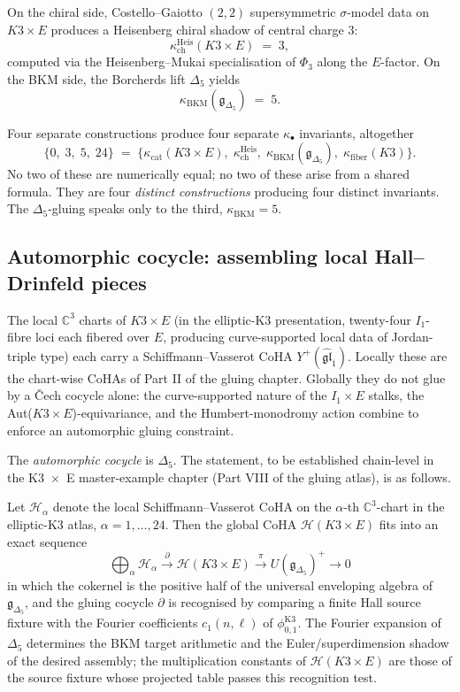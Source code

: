 On the chiral side, Costello--Gaiotto $(2, 2)$ supersymmetric $\sigma$-model data on $K3 \times E$ produces a Heisenberg chiral shadow of central charge $3$:
\[
  \kappa_{\mathrm{ch}}^{\mathrm{Heis}}(K3 \times E) \;=\; 3,
\]
computed via the Heisenberg--Mukai specialisation of $\Phi_3$ along the $E$-factor. On the BKM side, the Borcherds lift $\Delta_5$ yields
\[
  \kappa_{\mathrm{BKM}}(\mathfrak g_{\Delta_5}) \;=\; 5.
\]

Four separate constructions produce four separate $\kappa_\bullet$ invariants, altogether
\[
  \{0, \; 3, \; 5, \; 24\} \;=\; \bigl\{\kappa_{\mathrm{cat}}(K3 \times E), \; \kappa_{\mathrm{ch}}^{\mathrm{Heis}}, \; \kappa_{\mathrm{BKM}}(\mathfrak g_{\Delta_5}), \; \kappa_{\mathrm{fiber}}(K3)\bigr\}.
\]
No two of these are numerically equal; no two of these arise from a shared formula. They are four \emph{distinct constructions} producing four distinct invariants. The $\Delta_5$-gluing speaks only to the third, $\kappa_{\mathrm{BKM}} = 5$.

\subsection{Automorphic cocycle: assembling local Hall--Drinfeld pieces}

The local $\mathbb C^3$ charts of $K3 \times E$ (in the elliptic-K3 presentation, twenty-four $I_1$-fibre loci each fibered over $E$, producing curve-supported local data of Jordan-triple type) each carry a Schiffmann--Vasserot CoHA $Y^+(\widehat{\mathfrak{gl}}_1)$. Locally these are the chart-wise CoHAs of Part II of the gluing chapter. Globally they do not glue by a Čech cocycle alone: the curve-supported nature of the $I_1 \times E$ stalks, the Aut($K3 \times E$)-equivariance, and the Humbert-monodromy action combine to enforce an automorphic gluing constraint.

The \emph{automorphic cocycle} is $\Delta_5$. The statement, to be established chain-level in the K3~$\times$~E master-example chapter (Part VIII of the gluing atlas), is as follows.

\begin{conjecture}
\label{conj:automorphic-assembly-k3xe}
Let $\mathcal H_\alpha$ denote the local Schiffmann--Vasserot CoHA on the $\alpha$-th $\mathbb C^3$-chart in the elliptic-K3 atlas, $\alpha = 1, \ldots, 24$. Then the global CoHA $\mathcal H(K3 \times E)$ fits into an exact sequence
\[
  \bigoplus_\alpha \mathcal H_\alpha \xrightarrow{\;\partial\;} \mathcal H(K3 \times E) \xrightarrow{\;\pi\;} U(\mathfrak g_{\Delta_5})^+ \longrightarrow 0
\]
in which the cokernel is the positive half of the universal enveloping algebra of $\mathfrak g_{\Delta_5}$, and the gluing cocycle $\partial$ is recognised by comparing a finite Hall source fixture with the Fourier coefficients $c_1(n, \ell)$ of $\phi_{0, 1}^{\mathrm{K3}}$. The Fourier expansion of $\Delta_5$ determines the BKM target arithmetic and the Euler/superdimension shadow of the desired assembly; the multiplication constants of $\mathcal H(K3 \times E)$ are those of the source fixture whose projected table passes this recognition test.
\end{conjecture}

